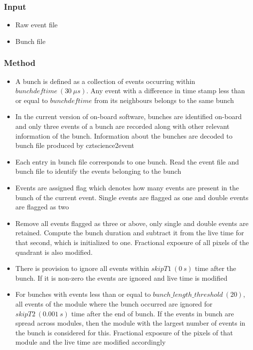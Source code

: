 \documentclass[11pt,oneside,a4paper]{article}
\begin{document}
\subsubsection*{Input}
\renewcommand\labelitemi{{\boldmath$\cdot$}}
\begin{itemize}
\item{Raw event file}
\item{Bunch file}    
\end{itemize}
\subsubsection*{Method}
\begin{itemize}
\item{A bunch is defined as a collection of events occurring within $bunchdeftime ~(30~\mu s)$. Any event
with a difference in time stamp less than or equal to $bunchdeftime$ from its neighbours belongs to the same bunch}
\item{In the current version of on-board software, bunches are identified on-board and only three 
events of a bunch are recorded along with other relevant information of the bunch. Information 
about the bunches are decoded to bunch file produced by cztscience2event}
\item{Each entry in bunch file corresponds 
to one bunch. Read the event file and bunch file to identify the events belonging to the bunch}
\item{Events are assigned flag which denotes how many events are present
in the bunch of the current event. Single events are flagged as one and 
double events are flagged as two}
\item{Remove all events flagged as three or above, only single and double
events are retained. Compute the bunch duration and subtract it from the 
live time for that second, which is initialized to one. Fractional exposure 
of all pixels of the quadrant is also modified.}

\item{There is provision to ignore all events within $skipT1 ~(0 ~s)$ time after the bunch. If it 
is non-zero the events are ignored and live time is modified}

\item{For bunches with events less than or equal to $bunch\_length\_threshold ~(20)$, all events of
the module where the bunch occurred are ignored for $skipT2 ~(0.001~s)$ time after the
end of bunch. If the events in bunch are spread across modules, then the module with the largest number 
of events in the bunch is considered for this. Fractional exposure of the pixels 
of that module and the live time are modified accordingly}


\end{itemize}
\end{document}
